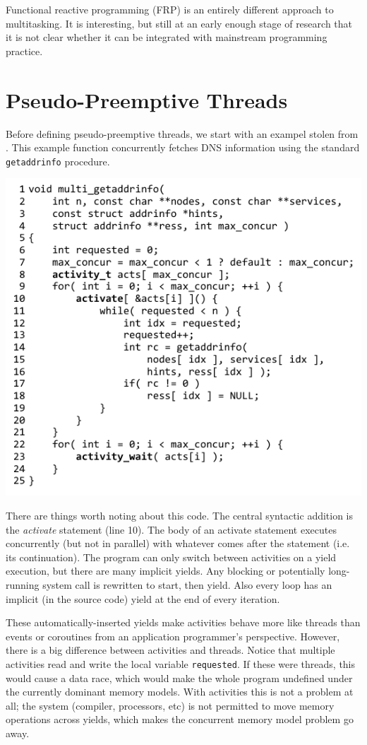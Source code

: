 \documentclass[10pt,preprint]{sigplanconf}
\begin{document}
Functional reactive programming (FRP) is an entirely different approach to multitasking.
It is interesting, but still at an early enough stage of research that it is not clear whether it can be integrated with mainstream programming practice.

\section{Pseudo-Preemptive Threads}

Before defining pseudo-preemptive threads, we start with an exampel stolen from \cite{Krohn2007}.
This example function concurrently fetches DNS information using the standard \texttt{getaddrinfo} procedure.

\hspace{-0.5cm}
\includegraphics{multi_getaddrinfo.pdf}

There are things worth noting about this code.
The central syntactic addition is the \emph{activate} statement (line 10).
The body of an activate statement executes concurrently (but not in parallel) with whatever comes after the statement (i.e. its continuation).
The program can only switch between activities on a yield execution, but there are many implicit yields.
Any blocking or potentially long-running system call is rewritten to start, then yield.
Also every loop has an implicit (in the source code) yield at the end of every iteration.

These automatically-inserted yields make activities behave more like threads than events or coroutines from an application programmer's perspective.
However, there is a big difference between activities and threads.
Notice that multiple activities read and write the local variable \texttt{requested}.
If these were threads, this would cause a data race, which would make the whole program undefined under the currently dominant memory models.
With activities this is not a problem at all; the system (compiler, processors, etc) is not permitted to move memory operations across yields, which makes the concurrent memory model problem go away.
\end{document}
